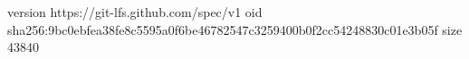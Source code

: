 version https://git-lfs.github.com/spec/v1
oid sha256:9bc0ebfea38fe8c5595a0f6be46782547c3259400b0f2cc54248830c01e3b05f
size 43840
